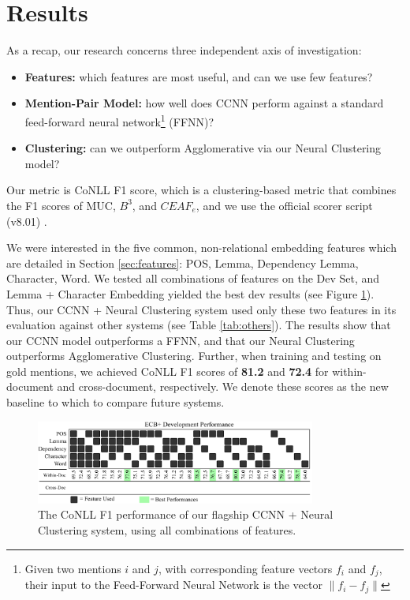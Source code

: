 \documentclass[11pt,a4paper]{article}
\begin{document}
\section{Results}
As a recap, our research concerns three independent axis of investigation:
\begin{itemize}
\item \textbf{Features:} which features are most useful, and can we use few features?
\item \textbf{Mention-Pair Model:} how well does CCNN perform against a standard feed-forward neural network\footnote{Given two mentions $i$ and $j$, with corresponding feature vectors $f_i$ and $f_j$, their input to the Feed-Forward Neural Network is the vector $\|f_{i} - f_{j}\|$} (FFNN)?
\item \textbf{Clustering:} can we outperform Agglomerative via our Neural Clustering model?
\end{itemize}

Our metric is CoNLL F1 score, which is a clustering-based metric that combines the F1 scores of MUC, $B^{3}$, and $CEAF_{e}$, and we use the official scorer script (v8.01) \cite{Pradhan+etal:14a}.

We were interested in the five common, non-relational embedding features which are detailed in Section \ref{sec:features}: POS, Lemma, Dependency Lemma, Character, Word.  We tested all combinations of features on the Dev Set, and Lemma + Character Embedding yielded the best dev results (see Figure \ref{fig:allfeatures}).  Thus, our CCNN + Neural Clustering system used only these two features in its evaluation against other systems (see Table \ref{tab:others}).  The results show that our CCNN model outperforms a FFNN, and that our Neural Clustering outperforms Agglomerative Clustering.  Further, when training and testing on gold mentions, we achieved CoNLL F1 scores of \textbf{81.2} and \textbf{72.4} for within-document and cross-document, respectively.  We denote these scores as the new baseline to which to compare future systems.

\begin{figure}[h]
\centering
	\includegraphics[width=0.82\textwidth]{features.pdf}
	\caption{The CoNLL F1 performance of our flagship CCNN + Neural Clustering system, using all combinations of features.}
	\label{fig:allfeatures}
\end{figure}
\end{document}
